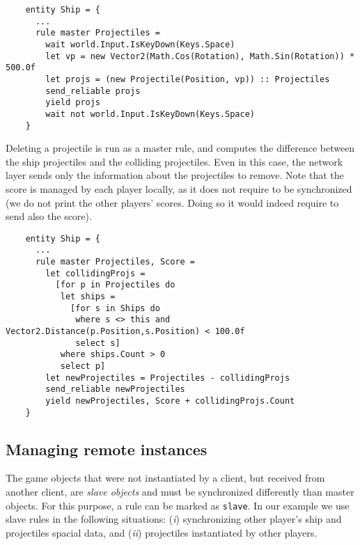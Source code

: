 \begin{enumerate}[(i)]
	\begin{lstlisting}
	entity Ship = {
	  ...
	  rule master Projectiles =
	    wait world.Input.IsKeyDown(Keys.Space)
	    let vp = new Vector2(Math.Cos(Rotation), Math.Sin(Rotation)) * 500.0f
	    let projs = (new Projectile(Position, vp)) :: Projectiles
	    send_reliable projs
	    yield projs
	    wait not world.Input.IsKeyDown(Keys.Space)
	}
	\end{lstlisting}
	
	Deleting a projectile is run as a master rule, and computes the difference between the ship projectiles and the colliding projectiles. Even in this case, the network layer sends only the information about the projectiles to remove. Note that the score is managed by each player locally, as it does not require to be synchronized (we do not print the other players' scores. Doing so it would indeed require to send also the score).
	
	\begin{lstlisting}
	entity Ship = {
	  ...
	  rule master Projectiles, Score =
	    let collidingProjs =
	      [for p in Projectiles do
	       let ships =
	         [for s in Ships do
	          where s <> this and Vector2.Distance(p.Position,s.Position) < 100.0f
	          select s]
	       where ships.Count > 0
	       select p]
	    let newProjectiles = Projectiles - collidingProjs
	    send_reliable newProjectiles
	    yield newProjectiles, Score + collidingProjs.Count
	}
	\end{lstlisting}
\end{enumerate}

\subsection*{Managing remote instances}
The game objects that were not instantiated by a client, but received from another client, are \textit{slave objects} and must be synchronized differently than master objects. For this purpose, a rule can be marked as \texttt{slave}. In our example we use slave rules in the following situations: (\textit{i}) synchronizing other player's ship and projectiles spacial data, and (\textit{ii}) projectiles instantiated by other players.

